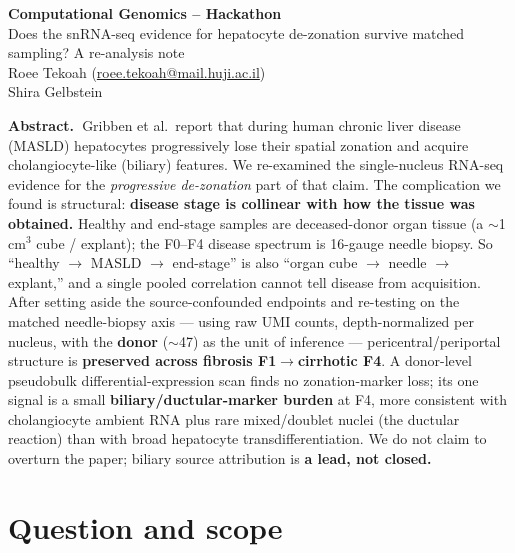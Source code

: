 \documentclass[11pt,a4paper]{article}
\begin{document}
\begin{center}
  {\Large\bfseries Computational Genomics -- Hackathon}\\[0.4em]
  {\large Does the snRNA-seq evidence for hepatocyte de-zonation survive matched sampling? A re-analysis note}\\[0.7em]
  Roee Tekoah \quad(\href{mailto:roee.tekoah@mail.huji.ac.il}{roee.tekoah@mail.huji.ac.il})\\[0.2em]
  Shira Gelbstein
\end{center}
\vspace{0.4em}

{\small\noindent\textbf{Abstract.~}Gribben et al.\ report that during human chronic liver disease (MASLD) hepatocytes progressively lose their spatial zonation and acquire cholangiocyte-like (biliary) features. We re-examined the single-nucleus RNA-seq evidence for the \emph{progressive de-zonation} part of that claim. The complication we found is structural: \textbf{disease stage is collinear with how the tissue was obtained.} Healthy and end-stage samples are deceased-donor organ tissue (a $\sim$1\,cm$^3$ cube / explant); the F0--F4 disease spectrum is 16-gauge needle biopsy. So ``healthy $\to$ MASLD $\to$ end-stage'' is also ``organ cube $\to$ needle $\to$ explant,'' and a single pooled correlation cannot tell disease from acquisition. After setting aside the source-confounded endpoints and re-testing on the matched needle-biopsy axis --- using raw UMI counts, depth-normalized per nucleus, with the \textbf{donor} ($\sim$47) as the unit of inference --- pericentral/periportal structure is \textbf{preserved across fibrosis F1$\to$cirrhotic F4}. A donor-level pseudobulk differential-expression scan finds no zonation-marker loss; its one signal is a small \textbf{biliary/ductular-marker burden} at F4, more consistent with cholangiocyte ambient RNA plus rare mixed/doublet nuclei (the ductular reaction) than with broad hepatocyte transdifferentiation. We do not claim to overturn the paper; biliary source attribution is \textbf{a lead, not closed.}}\par\vspace{0.5em}

\setcounter{tocdepth}{2}
\begingroup\renewcommand{\contentsname}{\normalsize Contents}{\small\tableofcontents}\endgroup
\vspace{0.6em}

\section{Question and scope}
\end{document}
